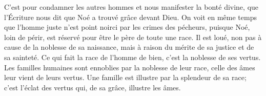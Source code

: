 C’est pour condamner les autres hommes et nous manifester la bonté divine,
	que l’Écriture nous dit que Noé a trouvé grâce devant Dieu.
On voit en même temps que l’homme juste
	n’est point noirci par les crimes des pécheurs,
	puisque Noé, loin de périr,
	est réservé pour être le père de toute une race.
Il est loué, non pas à cause de la noblesse de sa naissance,
	mais à raison du mérite de sa justice et de sa sainteté.
Ce qui fait la race de l’homme de bien, c’est la noblesse de ses vertus.
Les familles humaines sont ennoblies par la noblesse de leur race,
	celle des âmes leur vient de leurs vertus.
	Une famille est illustre par la splendeur de sa race;
	c’est l’éclat des vertus qui, de sa grâce, illustre les âmes.
